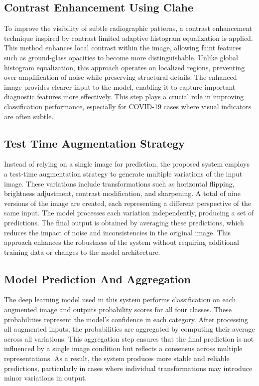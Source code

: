\documentclass[a4paper,fleqn]{cas-dc}
\begin{document}
\subsection{Contrast Enhancement Using Clahe}
To improve the visibility of subtle radiographic patterns, a contrast enhancement technique inspired by contrast limited adaptive histogram equalization is applied. This method enhances local contrast within the image, allowing faint features such as ground-glass opacities to become more distinguishable. Unlike global histogram equalization, this approach operates on localized regions, preventing over-amplification of noise while preserving structural details. The enhanced image provides clearer input to the model, enabling it to capture important diagnostic features more effectively. This step plays a crucial role in improving classification performance, especially for COVID-19 cases where visual indicators are often subtle.

\subsection{Test Time Augmentation Strategy}
Instead of relying on a single image for prediction, the proposed system employs a test-time augmentation strategy to generate multiple variations of the input image. These variations include transformations such as horizontal flipping, brightness adjustment, contrast modification, and sharpening. A total of nine versions of the image are created, each representing a different perspective of the same input. The model processes each variation independently, producing a set of predictions. The final output is obtained by averaging these predictions, which reduces the impact of noise and inconsistencies in the original image. This approach enhances the robustness of the system without requiring additional training data or changes to the model architecture.

\subsection{Model Prediction And Aggregation}
The deep learning model used in this system performs classification on each augmented image and outputs probability scores for all four classes. These probabilities represent the model’s confidence in each category. After processing all augmented inputs, the probabilities are aggregated by computing their average across all variations. This aggregation step ensures that the final prediction is not influenced by a single image condition but reflects a consensus across multiple representations. As a result, the system produces more stable and reliable predictions, particularly in cases where individual transformations may introduce minor variations in output.
\end{document}
